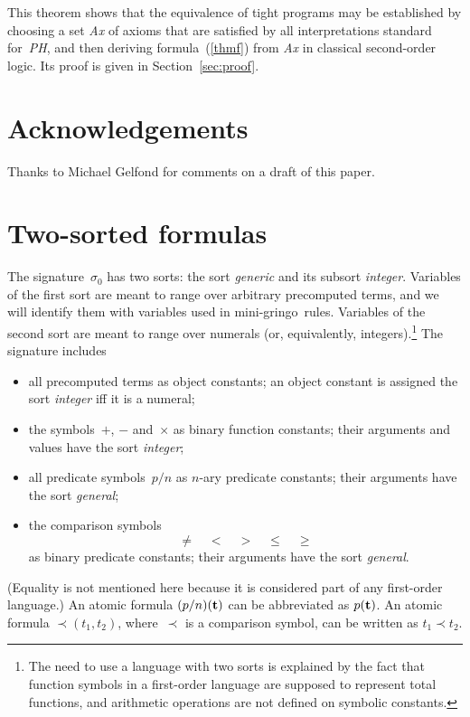 \documentclass{article}
\def\gringo{{\sc gringo}}
\begin{document}
This theorem shows that the equivalence of tight programs may be established
by choosing a set \emph{Ax} of axioms that are satisfied by
all interpretations standard for~\emph{PH}, and then deriving
formula~(\ref{thmf}) from \emph{Ax} in classical second-order logic.  Its
proof is given in Section~\ref{sec:proof}.

\bigskip
[ To be continued. ]

\section*{Acknowledgements}

Thanks to Michael Gelfond for comments on a draft of this paper.




\appendix

\section{Two-sorted formulas} \label{appa}

The signature~$\sigma_0$ \cite[Section~2.2]{fan22}
has two sorts: the sort \emph{generic} and its subsort
\emph{integer}.
Variables of the first sort are meant to
range over arbitrary precomputed terms, and we will identify them with
variables used in mini-\gringo\ rules.  Variables of the second sort are meant
to range over numerals (or, equivalently, integers).\footnote{The need to
  use a language with two sorts is explained by the fact that function symbols
in a first-order language are supposed to represent total functions, and
arithmetic operations are not defined on symbolic constants.}
The signature includes
\begin{itemize}
\item all precomputed terms as object constants; an object constant
  is assigned the sort \emph{integer} iff it is a numeral;
\item the symbols~$+$, $-$ and~$\times$ as binary function constants;
  their arguments and values have the sort \emph{integer};
\item all predicate symbols~$p/n$ as $n$-ary predicate
  constants; their arguments have the sort \emph{general};
\item the comparison symbols
$$\neq\quad<\quad>\quad\leq\quad\geq$$
as binary predicate constants; their arguments have the sort \emph{general}.
\end{itemize}
(Equality is not mentioned here because it is considered part of any
first-order language.)  An atomic formula $(p/n)({\bf t})$ can be abbreviated
as $p({\bf t})$. An atomic formula $\prec\!\!(t_1,t_2)$, where~$\prec$ is a
comparison symbol, can be written as $t_1\prec t_2$.
\end{document}
